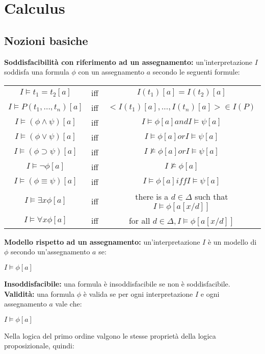 \documentclass[../main.tex]{subfiles}
\newcommand{\spazio}{\vspace{1em} \newline}
\begin{document}
   \chapter{Calculus}
   \section{Nozioni basiche}
   \textbf{Soddisfacibilità con riferimento ad un assegnamento:} un'interpretazione $I$ soddisfa una formula $\phi$ con un assegnamento $a$ secondo le seguenti formule:
   \begin{center}
      \begin{tabular}{c c c}
         $I \models t_1 = t_2 [a]$ & iff & $I(t_1)[a]=I(t_2)[a]$\\
         $I \models P(t_1, \dots ,t_n)[a]$ & iff & $< I(t_1)[a], \dots , I(t_n)[a] > \in I(P)$\\
         $I \models (\phi \land \psi)[a]$ & iff & $I \models \phi[a] and I \models \psi[a]$\\
         $I \models (\phi \lor \psi)[a]$ & iff & $I \models \phi[a] or I \models \psi[a]$\\
         $I \models (\phi \supset \psi)[a]$ & iff & $I \not \models \phi [a] or I \models \psi[a]$\\
         $I \models \lnot \phi[a]$ & iff & $I \not \models \phi[a]$\\
         $I \models (\phi \equiv \psi)[a]$ & iff & $I \models \phi[a] iff I \models \psi[a]$\\
         $I \models \exists x \phi[a]$ & iff & there is a $d \in \Delta$ such that $I \models \phi[a[x/d]]$\\
         $I \models \forall x \phi[a]$ & iff & for all $d \in \Delta, I \models \phi[a[x/d]]$
      \end{tabular}
   \end{center}
   \textbf{Modello rispetto ad un assegnamento:} un'interpretazione $I$ è un modello di $\phi$ secondo un'assegnamento $a$ se:
   \begin{center}
      $I \models \phi[a]$
   \end{center}
   \textbf{Insoddisfacibile:} una formula è insoddisfacibile se non è soddisfacibile.
   \spazio
   \textbf{Validità:} una formula $\phi$ è valida se per ogni interpretazione $I$ e ogni assegnamento $a$ vale che:
   \begin{center}
      $I \models \phi[a]$
   \end{center}
   Nella logica del primo ordine valgono le stesse proprietà della logica proposizionale, quindi:
\end{document}
